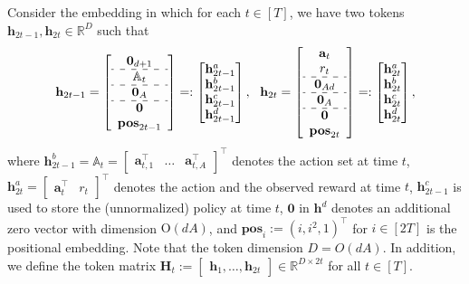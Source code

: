 \documentclass[10pt]{article}
\newcommand{\<}{\left\langle}
\renewcommand{\>}{\right\rangle}
\newcommand{\bzero}{{\mathbf 0}}
\newcommand{\R}{\mathbb{R}}
\newcommand{\posv}{{\mathbf{pos}}}
\newcommand{\parta}{{a}}
\newcommand{\partb}{{b}}
\newcommand{\partc}{{c}}
\newcommand{\partd}{{d}}
\newcommand{\totlen}{{T}}
\newcommand{\conO}{{\mathrm{O}}}
\def\sA{{\mathbb{A}}}
\def\bH{{\mathbf H}}
\def\ba{{\mathbf a}}
\def\bh{{\mathbf h}}
\begin{document}
Consider the embedding in which for each $t\in[\totlen]$, we have two tokens $\bh_{2t-1},\bh_{2t}\in\R^D$ such that
\[
\begin{aligned}
\bh_{2t-1}=
\left[
\begin{array}{c}
     \bzero_{d+1} \\
     \hdashline
     \sA_t\\
     \hdashline
     \bzero_A\\
     \hdashline
      \bzero\\ \posv_{2t-1}
\end{array}
\right]









=:
\begin{bmatrix}
     \bh_{2t-1}^{\parta} \\  \bh_{2t-1}^{\partb}\\  \bh_{2t-1}^{\partc}\\   \bh_{2t-1}^{\partd}\\
\end{bmatrix},~~
\bh_{2t}=
\left[
\begin{array}{cc}
     \ba_{t} \\
      r_t\\
      \hdashline
       \bzero_{Ad}\\
       \hdashline
       \bzero_{A}\\
       \hdashline
       \bzero\\ \posv_{2t}
\end{array}
\right]=:
\begin{bmatrix}
    \bh_{2t}^{\parta} \\  \bh_{2t}^{\partb}\\   \bh_{2t}^{\partc}\\   \bh_{2t}^{\partd}
\end{bmatrix},
\end{aligned}
\]
where $\bh_{2t-1}^{\partb}=\sA_t=\begin{bmatrix}
    \ba_{t,1}^\top &\ldots & \ba_{t,A}^\top
\end{bmatrix}^\top$ denotes the action set at time $t$, $\bh_{2t}^{\parta}=\begin{bmatrix}
    \ba_t^\top &r_t
\end{bmatrix}^\top$ denotes the action and the observed reward at time $t$, $\bh^\partc_{2t-1}$ is used to store the (unnormalized) policy at time  $t$, $\bzero$ in $\bh^\partd$ denotes an additional zero vector with  dimension $\conO(dA)$, and $\posv_i:=(i,i^2,1)^\top$ for $i\in[2\totlen]$ is the positional embedding.    Note that the token dimension $D= O(dA)$. In addition, we define the token matrix $\bH_t:=\begin{bmatrix}
    \bh_1,\ldots,\bh_{2t}
\end{bmatrix}\in\R^{D\times 2t}$ for all $t\in[\totlen]$.
\end{document}
